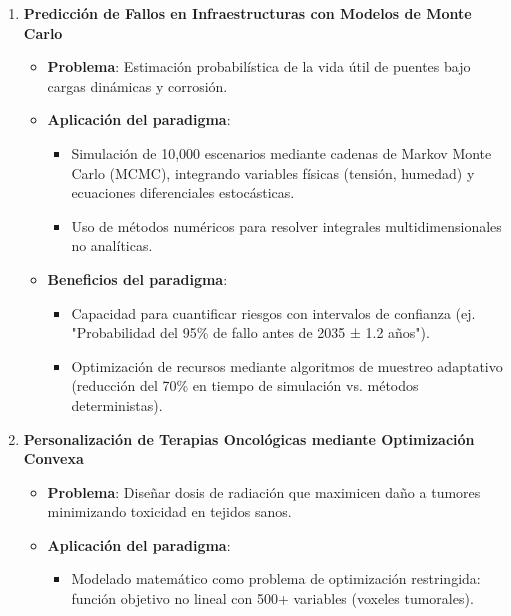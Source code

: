 \documentclass[14pt]{extarticle}
\begin{document}
  \begin{enumerate}
    \item \textbf{Predicción de Fallos en Infraestructuras con Modelos de Monte Carlo}

      \begin{itemize}
        \item \textbf{Problema}: Estimación probabilística de la vida útil de puentes bajo cargas dinámicas y corrosión.
        
        \item \textbf{Aplicación del paradigma}:

          \begin{itemize}
            \item Simulación de 10,000 escenarios mediante cadenas de Markov Monte Carlo (MCMC), integrando variables físicas (tensión, humedad) y ecuaciones diferenciales estocásticas.

            \item Uso de métodos numéricos para resolver integrales multidimensionales no analíticas.
          \end{itemize}

        \item \textbf{Beneficios del paradigma}:
        
          \begin{itemize}
            \item Capacidad para cuantificar riesgos con intervalos de confianza (ej. "Probabilidad del 95\% de fallo antes de 2035 ± 1.2 años").

            \item Optimización de recursos mediante algoritmos de muestreo adaptativo (reducción del 70\% en tiempo de simulación vs. métodos deterministas).
          \end{itemize}
      \end{itemize}

    \item \textbf{Personalización de Terapias Oncológicas mediante Optimización Convexa}

      \begin{itemize}
        \item \textbf{Problema}: Diseñar dosis de radiación que maximicen daño a tumores minimizando toxicidad en tejidos sanos.
        
        \item \textbf{Aplicación del paradigma}:

          \begin{itemize}
            \item Modelado matemático como problema de optimización restringida: función objetivo no lineal con 500+ variables (voxeles tumorales).
            

\end{itemize}
\end{itemize}
\end{enumerate}
\end{document}
